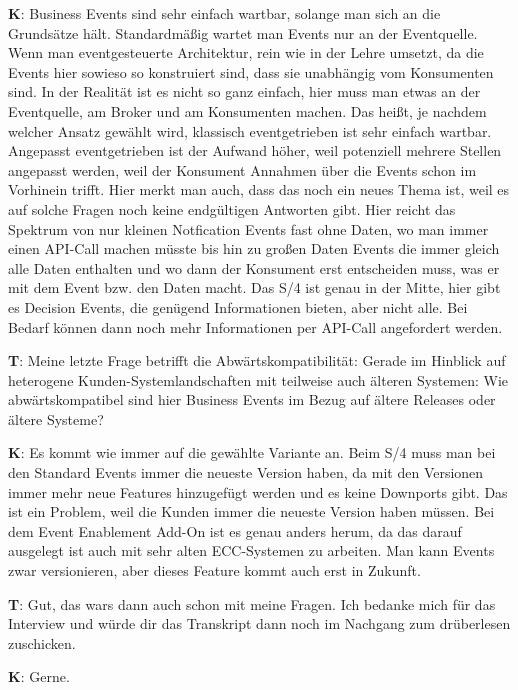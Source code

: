 \begin{list}{X:}{\setlength{\labelsep}{5mm}}
 \item[\textbf{K}:] Business Events sind sehr einfach wartbar, solange man sich an die Grundsätze hält. Standardmä{\ss}ig wartet man Events nur an der Eventquelle. Wenn man eventgesteuerte Architektur, rein wie in der Lehre umsetzt, da die Events hier sowieso so konstruiert sind, dass sie unabhängig vom Konsumenten sind. In der Realität ist es nicht so ganz einfach, hier muss man etwas an der Eventquelle, am Broker und am Konsumenten machen. Das hei{\ss}t, je nachdem welcher Ansatz gewählt wird, klassisch eventgetrieben ist sehr einfach wartbar. Angepasst eventgetrieben ist der Aufwand höher, weil potenziell mehrere Stellen angepasst werden, weil \zB der Konsument Annahmen über die Events schon im Vorhinein trifft. Hier merkt man auch, dass das noch ein neues Thema ist, weil es auf solche Fragen noch keine endgültigen Antworten gibt. Hier reicht das Spektrum von nur kleinen Notfication Events fast ohne Daten, wo man immer einen API-Call machen müsste bis hin zu gro{\ss}en Daten Events die immer gleich alle Daten enthalten und wo dann der Konsument erst entscheiden muss, was er mit dem Event bzw. den Daten macht. Das S/4 ist genau in der Mitte, hier gibt es Decision Events, die genügend Informationen bieten, aber nicht alle. Bei Bedarf können dann noch mehr Informationen per API-Call angefordert werden.
 \item[\textbf{T}:] Meine letzte Frage betrifft die Abwärtskompatibilität: Gerade im Hinblick auf heterogene Kunden-Systemlandschaften mit teilweise auch älteren Systemen: Wie abwärtskompatibel sind hier Business Events im Bezug auf ältere Releases oder ältere Systeme?
 \item[\textbf{K}:] Es kommt wie immer auf die gewählte Variante an. Beim S/4 muss man bei den Standard Events immer die neueste Version haben, da mit den Versionen immer mehr neue Features hinzugefügt werden und es keine Downports gibt. Das ist ein Problem, weil die Kunden immer die neueste Version haben müssen. Bei dem Event Enablement Add-On ist es genau anders herum, da das darauf ausgelegt ist auch mit sehr alten ECC-Systemen zu arbeiten. Man kann Events zwar versionieren, aber dieses Feature kommt auch erst in Zukunft.
 \item[\textbf{T}:] Gut, das wars dann auch schon mit meine Fragen. Ich bedanke mich für das Interview und würde dir das Transkript dann noch im Nachgang zum drüberlesen zuschicken.
 \item[\textbf{K}:] Gerne.
\end{list}

